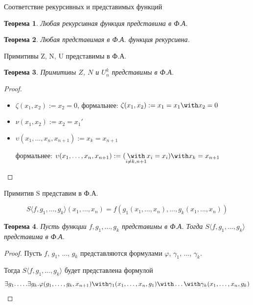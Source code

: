 \documentclass[aspectratio=169]{beamer}
\newtheorem{thm}{Теорема}[section]
\begin{document}
\begin{frame}{Соответствие рекурсивных и представимых функций}
\begin{thm}Любая рекурсивная функция представима в Ф.А.\end{thm}\pause

\begin{thm}Любая представимая в Ф.А. функция рекурсивна.\end{thm}
\end{frame}

\begin{frame}{Примитивы Z, N, U представимы в Ф.А.}
\begin{thm}
Примитивы $Z$, $N$ и $U^k_n$ представимы в Ф.А.
\end{thm}\pause

\begin{proof}
\begin{itemize}
\item $\zeta(x_1,x_2) := x_2=0$, \pause формальнее: $\zeta(x_1,x_2) := x_1=x_1 \with x_2=0$\pause
\item $\nu(x_1,x_2) := x_2=x_1'$\pause
\item $\upsilon(x_1,\dots,x_n,x_{n+1}) := x_k = x_{n+1}$ \pause \vspace{0.1cm}

формальнее: 
     $\upsilon(x_1,\dots,x_n,x_{n+1}) := (\underset{i\ne k,n+1}{\with} x_i=x_i) \with x_k = x_{n+1}$
\end{itemize}
\end{proof}
\end{frame}

\begin{frame}{Примитив S представим в Ф.А.}

$$S\langle f,g_1,\dots,g_k\rangle(x_1,\dots,x_n) = f(g_1(x_1,\dots,x_n),\dots,g_k(x_1,\dots,x_n))$$\pause
\begin{thm}
Пусть функции $f,g_1,\dots,g_k$ представимы в Ф.А. Тогда $S\langle f,g_1,\dots,g_k \rangle$ представима в Ф.А.
\end{thm}\pause

\begin{proof}
Пусть $f$, $g_1$, ..., $g_k$ представляются формулами $\varphi$, $\gamma_1$, ..., $\gamma_k$. \pause

Тогда 
$S\langle f,g_1,\dots,g_k\rangle$ будет представлена формулой
$$\exists g_1.\dots.\exists g_k.\varphi(g_1,\dots,g_k,x_{n+1})\with\gamma_1(x_1,\dots,x_n,g_1)\with\dots\with\gamma_k(x_1,\dots,x_n,g_k)$$
\end{proof}

\end{frame}
\end{document}

